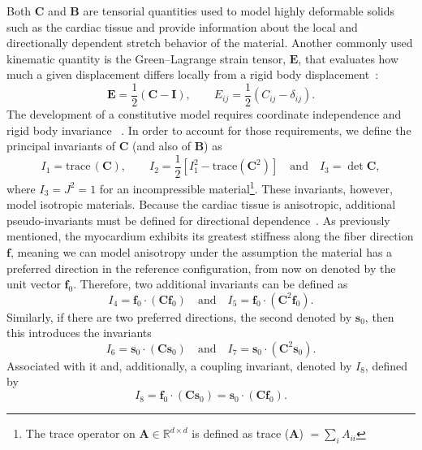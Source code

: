 \documentclass[a4paper,11pt]{article}
\begin{document}
Both $\mathbf{C}$ and $\mathbf{B}$ are tensorial quantities used to model highly deformable solids such as the cardiac tissue and provide information about the local and directionally dependent stretch behavior of the material. Another commonly used kinematic quantity is the Green–Lagrange strain tensor, $\mathbf{E}$, that evaluates how much a given displacement differs locally from a rigid body displacement~\cite{zeidi2018mechanics}:
\begin{equation}
\mathbf{E} = \frac{1}{2}(\mathbf{C} - \mathbf{I}), \qquad E_{ij} = \frac{1}{2}(C_{ij} - \delta_{ij}).
\end{equation}
The development of a constitutive model requires coordinate independence and rigid body invariance ~\cite{ogden1997non, spencer2004continuum}. In order to account for those requirements, we define the principal invariants of $\mathbf{C}$ (and also of $\mathbf{B}$) as
\begin{equation}
\label{I123}
I_1=\text{trace}\,(\mathbf{C}), \qquad I_2=\frac{1}{2}[I_1^2-\text{trace}(\mathbf{C}^2)] \quad \text{and} \quad I_3=\det \mathbf{C},
\end{equation}
where $I_3=J^2=1$ for an incompressible material\footnote{The trace operator on $\mathbf{A} \in \mathbb{R}^{d\times d}$ is deﬁned as trace ($\mathbf{A}$) $=\sum_i A_{ii}$}. These invariants, however, model isotropic materials. Because the cardiac tissue is anisotropic, additional pseudo-invariants must be defined for directional dependence~\cite{holzapfel2000continuum}. As previously mentioned, the myocardium exhibits its greatest stiffness along the fiber direction $\mathbf{f}$, meaning we can model anisotropy under the assumption the material has a preferred direction in the reference conﬁguration, from now on denoted by the unit vector $\mathbf{f}_0$. Therefore, two additional invariants can be defined as
\begin{equation}
\label{I45}
I_4=\mathbf{f}_0\cdot(\mathbf{C}\mathbf{f}_0) \quad \text{and} \quad I_5=\mathbf{f}_0 \cdot(\mathbf{C}^2\mathbf{f}_0).
\end{equation}
Similarly, if there are two preferred directions, the second denoted by $\mathbf{s}_0$, then this introduces the invariants
\begin{equation}
\label{I67}
I_6=\mathbf{s}_0\cdot(\mathbf{C}\mathbf{s}_0) \quad \text{and} \quad I_7=\mathbf{s}_0 \cdot(\mathbf{C}^2\mathbf{s}_0).
\end{equation}
Associated with it and, additionally, a coupling invariant, denoted by $I_8$, deﬁned by
\begin{equation}
\label{I8}
I_8=\mathbf{f}_0\cdot(\mathbf{C}\mathbf{s}_0)=\mathbf{s}_0\cdot(\mathbf{C}\mathbf{f}_0).
\end{equation}
\end{document}

